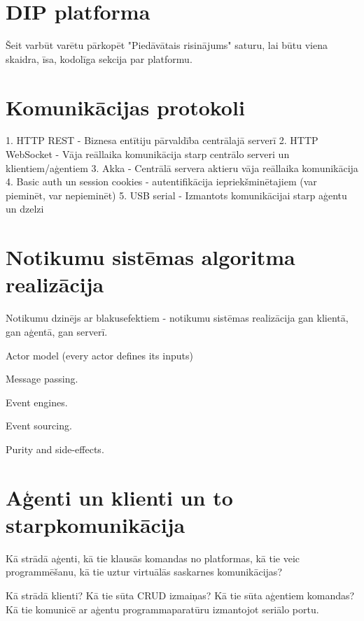 
\section{DIP platforma}

Šeit varbūt varētu pārkopēt "Piedāvātais risinājums" saturu, lai būtu viena skaidra, īsa, kodolīga sekcija par platformu. 

\section{Komunikācijas protokoli}

1. HTTP REST - Biznesa entītiju pārvaldība centrālajā serverī
2. HTTP WebSocket - Vāja reāllaika komunikācija starp centrālo serveri un klientiem/aģentiem
3. Akka - Centrālā servera aktieru vāja reāllaika komunikācija
4. Basic auth un session cookies - autentifikācija iepriekšminētajiem (var pieminēt, var nepieminēt)
5. USB serial - Izmantots komunikācijai starp aģentu un dzelzi

\section{Notikumu sistēmas algoritma realizācija}

Notikumu dzinējs ar blakusefektiem - notikumu sistēmas realizācija gan klientā, gan aģentā, gan serverī.

Actor model (every actor defines its inputs)

Message passing.

Event engines.

Event sourcing.

Purity and side-effects.

\section{Aģenti un klienti un to starpkomunikācija}

Kā strādā aģenti, kā tie klausās komandas no platformas, kā tie veic programmēšanu,
kā tie uztur virtuālās saskarnes komunikācijas?

Kā strādā klienti? Kā tie sūta CRUD izmaiņas? Kā tie sūta aģentiem komandas? Kā tie
komunicē ar aģentu programmaparatūru izmantojot seriālo portu.

